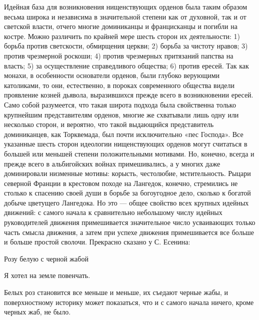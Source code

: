 Идейная  база  для  возникновения  нищенствующих  орденов  была  таким
образом  весьма широка  и  независима в  значительной  степени как  от
духовной,  так  и от  светской  власти,  отчего многие  доминиканцы  и
францисканцы  и погибли  на костре.  Можно различить  по крайней  мере
шесть сторон их деятельности:  1) борьба против светскости, обмирщения
церкви; 2) борьба за чистоту  нравов; 3) против чрезмерной роскоши; 4)
против чрезмерных  притязаний папства  на власть; 5)  за осуществление
справедливого  общества;   6)  против   ересей.  Так  как   монахи,  в
особенности основатели орденов, были  глубоко верующими католиками, то
они, естественно,  в пороках  современного общества  видели проявление
козней дьявола, выразившихся прежде всего в возникновении ересей. Само
собой  разумеется, что  такая широта  подхода была  свойственна только
крупнейшим представителям орденов, многие  же схватывали лишь одну или
несколько  сторон,  и  вероятно, что  такой  выдающийся  представитель
доминиканцев, как  Торквемада, был почти исключительно  «пес Господа».
Все  указанные  шесть  сторон идеологии  нищенствующих  орденов  могут
считаться в  большей или меньшей степени  положительными мотивами. Но,
конечно, всегда и прежде всего  в альбигойских войнах примешивались, а
у  многих даже  доминировали  низменные  мотивы: корысть,  честолюбие,
мстительность. Рыцари северной Франции в крестовом походе на Лангедок,
конечно,  стремились не  столько к  спасению  своей души  в борьбе  за
богоугодное  дело, сколько  к богатой  добыче цветущего  Лангедока. Но
это  ---  общее  свойство  всех крупных  идейных  движений:  с  самого
начала к сравнительно небольшому  числу идейных руководителей движения
примешивается  значительное  число  усваивающих  только  часть  смысла
движения,  а затем  при  успехе движения  примешивается  все больше  и
больше простой сволочи. Прекрасно сказано у С. Есенина:

Розу белую с черной жабой

Я хотел на земле повенчать.

Белых роз  становится все меньше и  меньше, их съедают черные  жабы, и
поверхностному  историку  может  показаться,  что и  с  самого  начала
ничего, кроме черных жаб, не было.

